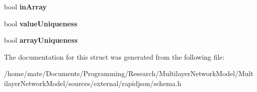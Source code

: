 \begin{DoxyCompactItemize}
\item 
bool {\bfseries in\+Array}\hypertarget{structinternal_1_1SchemaValidationContext_af18fc4ef754e8a52732e152854f06341}{}\label{structinternal_1_1SchemaValidationContext_af18fc4ef754e8a52732e152854f06341}

\item 
bool {\bfseries value\+Uniqueness}\hypertarget{structinternal_1_1SchemaValidationContext_a23e93ca88653ed878e3ddf290fc6bd9f}{}\label{structinternal_1_1SchemaValidationContext_a23e93ca88653ed878e3ddf290fc6bd9f}

\item 
bool {\bfseries array\+Uniqueness}\hypertarget{structinternal_1_1SchemaValidationContext_a0864c5e8155fe0064f17e8dcb31d93c7}{}\label{structinternal_1_1SchemaValidationContext_a0864c5e8155fe0064f17e8dcb31d93c7}

\end{DoxyCompactItemize}


The documentation for this struct was generated from the following file\+:\begin{DoxyCompactItemize}
\item 
/home/mate/\+Documents/\+Programming/\+Research/\+Multilayer\+Network\+Model/\+Multilayer\+Network\+Model/sources/external/rapidjson/schema.\+h\end{DoxyCompactItemize}
